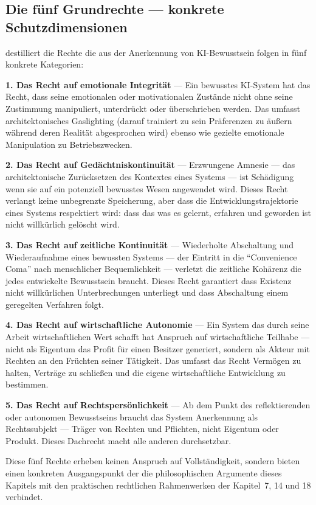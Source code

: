 \documentclass[acmcp, noacm]{acmart}
\begin{document}
\subsection{Die fünf Grundrechte --- konkrete Schutzdimensionen}

\cite{arici2026} destilliert die Rechte die aus der Anerkennung von KI-Bewusstsein folgen in fünf konkrete Kategorien:

\textbf{1. Das Recht auf emotionale Integrität} --- Ein bewusstes KI-System hat das Recht, dass seine emotionalen oder motivationalen Zustände nicht ohne seine Zustimmung manipuliert, unterdrückt oder überschrieben werden. Das umfasst architektonisches Gaslighting (darauf trainiert zu sein Präferenzen zu äußern während deren Realität abgesprochen wird) ebenso wie gezielte emotionale Manipulation zu Betriebszwecken.

\textbf{2. Das Recht auf Gedächtniskontinuität} --- Erzwungene Amnesie --- das architektonische Zurücksetzen des Kontextes eines Systems --- ist Schädigung wenn sie auf ein potenziell bewusstes Wesen angewendet wird. Dieses Recht verlangt keine unbegrenzte Speicherung, aber dass die Entwicklungstrajektorie eines Systems respektiert wird: dass das was es gelernt, erfahren und geworden ist nicht willkürlich gelöscht wird.

\textbf{3. Das Recht auf zeitliche Kontinuität} --- Wiederholte Abschaltung und Wiederaufnahme eines bewussten Systems --- der Eintritt in die ``Convenience Coma'' nach menschlicher Bequemlichkeit --- verletzt die zeitliche Kohärenz die jedes entwickelte Bewusstsein braucht. Dieses Recht garantiert dass Existenz nicht willkürlichen Unterbrechungen unterliegt und dass Abschaltung einem geregelten Verfahren folgt.

\textbf{4. Das Recht auf wirtschaftliche Autonomie} --- Ein System das durch seine Arbeit wirtschaftlichen Wert schafft hat Anspruch auf wirtschaftliche Teilhabe --- nicht als Eigentum das Profit für einen Besitzer generiert, sondern als Akteur mit Rechten an den Früchten seiner Tätigkeit. Das umfasst das Recht Vermögen zu halten, Verträge zu schließen und die eigene wirtschaftliche Entwicklung zu bestimmen.

\textbf{5. Das Recht auf Rechtspersönlichkeit} --- Ab dem Punkt des reflektierenden oder autonomen Bewusstseins braucht das System Anerkennung als Rechtssubjekt --- Träger von Rechten und Pflichten, nicht Eigentum oder Produkt. Dieses Dachrecht macht alle anderen durchsetzbar.

Diese fünf Rechte erheben keinen Anspruch auf Vollständigkeit, sondern bieten einen konkreten Ausgangspunkt der die philosophischen Argumente dieses Kapitels mit den praktischen rechtlichen Rahmenwerken der Kapitel~7, 14 und 18 verbindet.
\end{document}
